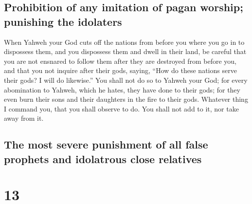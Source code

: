 \hypertarget{prohibition-of-any-imitation-of-pagan-worship-punishing-the-idolaters}{%
\subsection{Prohibition of any imitation of pagan worship; punishing the
idolaters}\label{prohibition-of-any-imitation-of-pagan-worship-punishing-the-idolaters}}

 When Yahweh your God cuts off the nations from before
you where you go in to dispossess them, and you dispossess them and
dwell in their land,  be careful that you are not
ensnared to follow them after they are destroyed from before you, and
that you not inquire after their gods, saying, ``How do these nations
serve their gods? I will do likewise.''  You shall not do
so to Yahweh your God; for every abomination to Yahweh, which he hates,
they have done to their gods; for they even burn their sons and their
daughters in the fire to their gods.  Whatever thing I
command you, that you shall observe to do. You shall not add to it, nor
take away from it.

\hypertarget{the-most-severe-punishment-of-all-false-prophets-and-idolatrous-close-relatives}{%
\subsection{The most severe punishment of all false prophets and
idolatrous close
relatives}\label{the-most-severe-punishment-of-all-false-prophets-and-idolatrous-close-relatives}}

\hypertarget{section-12}{%
\section{13}\label{section-12}}

